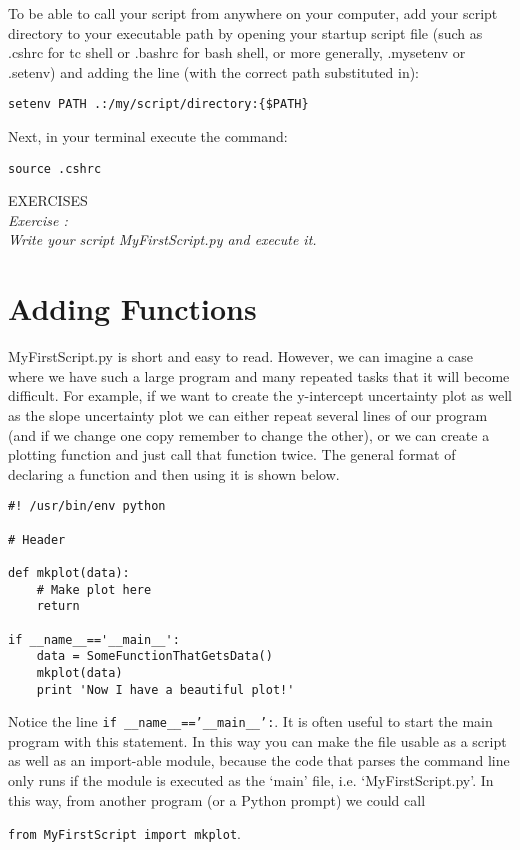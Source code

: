 To be able to call your script from anywhere on your computer, add
your script directory to your executable path by opening your startup 
script file (such as .cshrc for tc shell or .bashrc for bash shell, or more 
generally, .mysetenv or .setenv) and adding the line (with the correct 
path substituted in):

\texttt{setenv PATH .:/my/script/directory:\{\$PATH\}}

Next, in your terminal execute the command:

\texttt{\termtab source .cshrc}

{\color{blue} {\sf\small EXERCISES}} \\
{\it Exercise  :  \\
  Write your script MyFirstScript.py and execute it.
}

\section{Adding Functions}
\label{s:fun}
MyFirstScript.py is short and easy to read.  However, we can imagine a
case where we have such a large program and many repeated tasks that
it will become difficult.  For example, if we want to create the
y-intercept uncertainty plot as well as the slope uncertainty plot we
can either repeat several lines of our program (and if we change one
copy remember to change the other), or we can create a plotting
function and just call that function twice.  The general format of
declaring a function and then using it is shown below.

\begin{verbatim}
#! /usr/bin/env python

# Header

def mkplot(data): 
    # Make plot here
    return

if __name__=='__main__':
    data = SomeFunctionThatGetsData()
    mkplot(data)
    print 'Now I have a beautiful plot!'
\end{verbatim}

Notice the line \texttt{if \_\_name\_\_=='\_\_main\_\_':}.  It is often useful
to start the main program with this statement.  In this way you can
make the file usable as a script as well as an import-able module,
because the code that parses the command line only runs if the module
is executed as the `main' file, i.e. `MyFirstScript.py'.  In this way,
from another program (or a Python prompt) we could call

\texttt{from MyFirstScript import mkplot}.   

